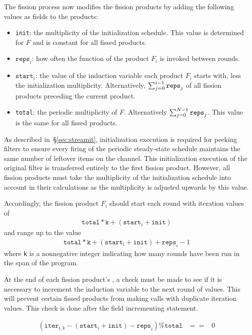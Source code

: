 The fission process now modifies the fission products by adding the
following values as fields to the products:
\begin{itemize}
    \item \texttt{init}: the multiplicity of the initialization schedule.  This value is determined for $F$ and is constant for all fissed products.
    \item $\texttt{reps}_i$: how often the \work function of the product $F_i$ is
      invoked between rounds.
    \item $\texttt{start}_i$: the value of the induction variable each product $F_i$ starts with, less the initialization multiplicity.  Alternatively, $\sum_{j=0}^{i-1}{\tt reps}_j$ of all fission products preceding the current product.
    \item \texttt{total}: the periodic multiplicity of $F$.  Alternatively $\sum_{j=0}^{N-1}{\tt reps}_j$. This value is the same for all fissed products.
\end{itemize}
As described in~\S\ref{sec:streamit}, initialization execution is required for peeking filters to ensure every firing of the periodic steady-state schedule maintains the same number of leftover items on the channel.  This initialization execution of the original filter is transferred entirely to the first fission product.  However, all fission products must take the multiplicity of the initialization schedule into account in their calculations as the multiplicity is adjusted upwards by this value.

Accordingly, the fission product $F_i$ should start each round with iteration values of
\begin{eqnarray*}
\texttt{total}*\texttt{k} + (\texttt{start}_i + \texttt{init})
\end{eqnarray*}
and range up to the value
\begin{eqnarray*}
\texttt{total}*\texttt{k} + (\texttt{start}_i + \texttt{init}) + \texttt{reps}_i - 1
\end{eqnarray*}
where \texttt{k} is a nonnegative integer indicating how many rounds have
been run in the span of the program.  

At the end of each fission product's \work, a check must be made to
see if it is necessary to increment the induction variable to the next
round of values.  This will prevent certain fissed products from
making calls with duplicate iteration values.  This check is done
after the field incrementing statement.

\begin{eqnarray*}
(\texttt{iter}_{i,k} - (\texttt{start}_i + \texttt{init}) - \texttt{reps}_i) \% \texttt{total} &==& 0
\end{eqnarray*}

